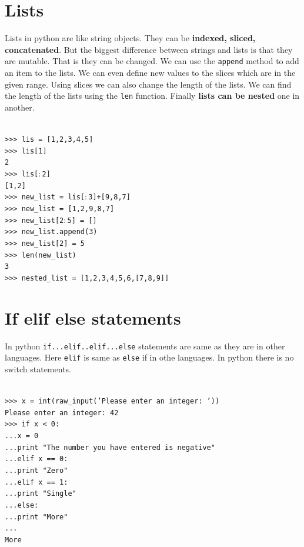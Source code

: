 \documentclass[12pt,a4paper]{article}
\begin{document}
\section{Lists}
Lists in python are like string objects. They can be \textbf{indexed, sliced, concatenated}. But the biggest difference between strings and lists is that they are mutable. That is they can be changed. We can use the \texttt{append} method to add an item to the lists. We can even define new values to the slices which are in the given range. Using slices we can also change the length of the lists. We can find the length of the lists using the \texttt{len} function. Finally \textbf{lists can be nested} one in another.
  
\texttt{\\
>>> lis = [1,2,3,4,5]\\
>>> lis[1]\\
2\\
>>> lis[$:$2]\\
{[1,2]}\\
>>> new\_list = lis[$:$3]+[9,8,7]\\
>>> new\_list = [1,2,9,8,7]\\
>>> new\_list[2$:$5] = []\\
>>> new\_list.append(3)\\
>>> new\_list[2] = 5\\
>>> len(new\_list)\\
3\\
>>> nested\_list = [1,2,3,4,5,6,[7,8,9]]\\
}



\section{If elif else statements}
In python \texttt{if...elif..elif...else} statements are same as they are in other languages. Here \texttt{elif} is same as \texttt{else} if in othe languages. In python there is no switch statements. 

\texttt{\\
>>> x = int(raw\_input('Please enter an integer: '))\\
Please enter an integer: 42\\
>>> if x < 0:\\
...\hspace{30pt}x = 0\\
...\hspace{30pt}print "The number you have entered is negative"\\
...elif x == 0:\\
...\hspace{30pt}print "Zero"\\
...elif x == 1:\\
...\hspace{30pt}print "Single"\\
...else:\\
...\hspace{30pt}print "More"\\
...\\
More
}
\end{document}
